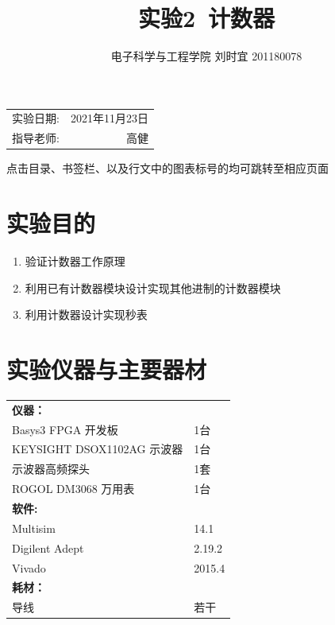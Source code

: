 \documentclass[UTF8]{ctexart}
\title{\textbf{实验2\ 计数器}} %
\author{电子科学与工程学院 刘时宜 201180078} %
\date{} %
\numberwithin{figure}{subsection}
\numberwithin{table}{subsection}
\numberwithin{equation}{subsection}
\begin{document}
\pagestyle{EE_Digital1Exp_template}

\maketitle %

\begin{center}
    \begin{tabular}{l r}
    实验日期: & 2021年11月23日 \\ %
    指导老师: & 高健 %
    \end{tabular}
    \par 点击目录、书签栏、以及行文中的图表标号的均可跳转至相应页面
    \end{center}
    

\tableofcontents

\section{实验目的}
\begin{enumerate}
    \item 验证计数器工作原理
    \item 利用已有计数器模块设计实现其他进制的计数器模块
    \item 利用计数器设计实现秒表
\end{enumerate}

\section{实验仪器与主要器材}
\begin{center}
    \begin{tabular}{ll}
        \textbf{仪器：} & \\
        Basys3 FPGA 开发板 & 1台\\
        KEYSIGHT DSOX1102AG 示波器 & 1台\\
        示波器高频探头 & 1套\\
        ROGOL DM3068 万用表 & 1台\\
        \textbf{软件:} & \\
        Multisim & 14.1 \\
        Digilent Adept & 2.19.2 \\
        Vivado & 2015.4 \\
        \textbf{耗材：} & \\
        导线 & 若干 \\
    \end{tabular}
\end{center}
\end{document}
